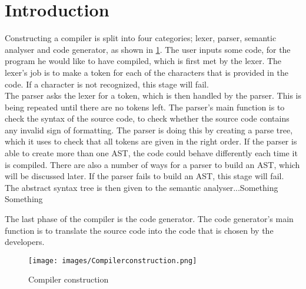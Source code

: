 \section*{Introduction}
Constructing a compiler is split into four categories; lexer, parser, semantic analyser and code generator, as shown in \ref{fig:Compilerconstruction}.
The user inputs some code, for the program he would like to have compiled, which is first met by the lexer. The lexer's job is to make a token for each of the characters that is provided in the code. If a character is not recognized, this stage will fail. \\


The parser asks the lexer for a token, which is then handled by the parser. This is being repeated until there are no tokens left. The parser's main function is to check the syntax of the source code, to check whether the source code contains any invalid sign of formatting. The parser is doing this by creating a parse tree, which it uses to check that all tokens are given in the right order. If the parser is able to create more than one AST, the code could behave differently each time it is compiled. There are also a number of ways for a parser to build an AST, which will be discussed later. If the parser fails to build an AST, this stage will fail. \\

The abstract syntax tree is then given to the semantic analyser...Something Something

The last phase of the compiler is the code generator. The code generator's main function is to translate the source code into the code that is chosen by the developers.


\begin{figure}[! h]
\centering
	 \texttt{[image: images/Compilerconstruction.png]}
		 \caption{Compiler construction}
	\label{fig:Compilerconstruction}
\end{figure}
